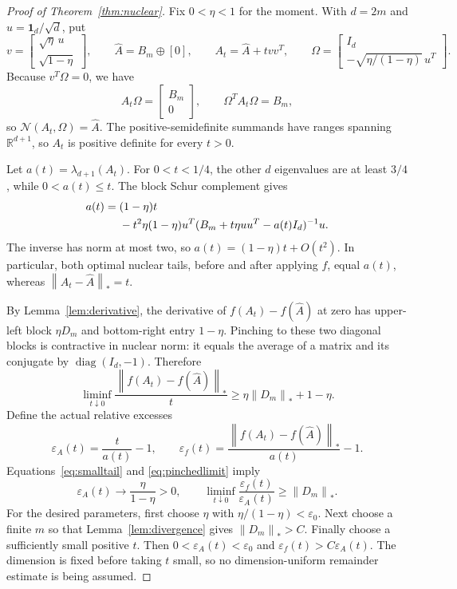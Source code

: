 \documentclass[11pt]{article}
\theoremstyle{definition}
\newcommand{\R}{\mathbb R}
\newcommand{\diag}{\operatorname{diag}}
\newcommand{\norm}[1]{\left\lVert#1\right\rVert}
\newcommand{\eps}{\varepsilon}
\begin{document}
\begin{proof}[Proof of Theorem~\ref{thm:nuclear}]
Fix $0<\eta<1$ for the moment. With $d=2m$ and $u=\boldsymbol1_d/\sqrt d$, put
\[
 v=\begin{bmatrix}\sqrt\eta\,u\\\sqrt{1-\eta}\end{bmatrix},\qquad
 \widehat A=B_m\oplus[0],\qquad
 A_t=\widehat A+tvv^T,
 \qquad
 \Omega=\begin{bmatrix}I_d\\-\sqrt{\eta/(1-\eta)}\,u^T\end{bmatrix}.
\]
Because $v^T\Omega=0$, we have
\[
 A_t\Omega=\begin{bmatrix}B_m\\0\end{bmatrix},\qquad
 \Omega^TA_t\Omega=B_m,
\]
so $\mathcal N(A_t,\Omega)=\widehat A$. The positive-semidefinite summands have ranges spanning $\R^{d+1}$, so $A_t$ is positive definite for every $t>0$.

Let $a(t)=\lambda_{d+1}(A_t)$. For $0<t<1/4$, the other $d$ eigenvalues are at least $3/4$, while $0<a(t)\le t$. The block Schur complement gives
\begin{align}\label{eq:smalltail}
 a(t)={}&(1-\eta)t\\
 &-t^2\eta(1-\eta)
 u^T(B_m+t\eta uu^T-a(t)I_d)^{-1}u.\notag
\end{align}
The inverse has norm at most two, so $a(t)=(1-\eta)t+O(t^2)$. In particular, both optimal nuclear tails, before and after applying $f$, equal $a(t)$, whereas $\norm{A_t-\widehat A}_*=t$.

By Lemma~\ref{lem:derivative}, the derivative of $f(A_t)-f(\widehat A)$ at zero has upper-left block $\eta D_m$ and bottom-right entry $1-\eta$. Pinching to these two diagonal blocks is contractive in nuclear norm: it equals the average of a matrix and its conjugate by $\diag(I_d,-1)$. Therefore
\begin{equation}\label{eq:pinchedlimit}
 \liminf_{t\downarrow0}
 \frac{\norm{f(A_t)-f(\widehat A)}_*}{t}
 \ge\eta\norm{D_m}_*+1-\eta.
\end{equation}
Define the actual relative excesses
\[
 \eps_A(t)=\frac{t}{a(t)}-1,\qquad
 \eps_f(t)=\frac{\norm{f(A_t)-f(\widehat A)}_*}{a(t)}-1.
\]
Equations~\eqref{eq:smalltail} and \eqref{eq:pinchedlimit} imply
\[
 \eps_A(t)\longrightarrow\frac\eta{1-\eta}>0,
 \qquad
 \liminf_{t\downarrow0}\frac{\eps_f(t)}{\eps_A(t)}
 \ge\norm{D_m}_*.
\]
For the desired parameters, first choose $\eta$ with $\eta/(1-\eta)<\eps_0$. Next choose a finite $m$ so that Lemma~\ref{lem:divergence} gives $\norm{D_m}_*>C$. Finally choose a sufficiently small positive $t$. Then $0<\eps_A(t)<\eps_0$ and $\eps_f(t)>C\eps_A(t)$. The dimension is fixed before taking $t$ small, so no dimension-uniform remainder estimate is being assumed.
\end{proof}
\end{document}
